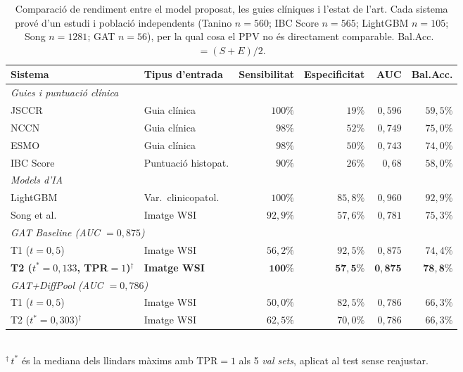 \documentclass[10pt,a4paper,twocolumn,twoside]{article}
\begin{document}
\begin{table}[h]
\centering
\caption{Comparació de rendiment entre el model proposat, les guies clíniques i l'estat de l'art.
Cada sistema prové d'un estudi i població independents
(Tanino $n\!=\!560$; IBC Score $n\!=\!565$; LightGBM $n\!=\!105$; Song $n\!=\!1281$; GAT $n\!=\!56$),
per la qual cosa el PPV no és directament comparable. Bal.Acc.~$=(S\!+\!E)/2$.}
\label{tab:comparison}
\small
\begin{tabular}{llrrrr}
\toprule
\textbf{Sistema} & \textbf{Tipus d'entrada} & \textbf{Sensibilitat} & \textbf{Especificitat} & \textbf{AUC} & \textbf{Bal.Acc.} \\
\midrule
\multicolumn{6}{l}{\textit{Guies i puntuació clínica}} \\[2pt]
JSCCR \cite{jsccr2019}        & Guia clínica  & $100\%$ & $19\%$  & $0{,}596$ & $59{,}5\%$ \\
NCCN                           & Guia clínica  & $98\%$  & $52\%$  & $0{,}749$ & $75{,}0\%$ \\
ESMO \cite{tanino2024comparative} & Guia clínica  & $98\%$  & $50\%$  & $0{,}743$ & $74{,}0\%$ \\
IBC Score \cite{dawson2024budding} & Puntuació histopat. & $90\%$ & $26\%$ & $0{,}68$ & $58{,}0\%$ \\
\midrule
\multicolumn{6}{l}{\textit{Models d'IA}} \\[2pt]
LightGBM \cite{piao2023ai}                          & Var.\ clinicopatol. & $100\%$  & $85{,}8\%$ & $0{,}960$ & $92{,}9\%$ \\
Song et al.\ \cite{song2024lnm}                     & Imatge WSI & $92{,}9\%$ & $57{,}6\%$ & $0{,}781$ & $75{,}3\%$ \\
\multicolumn{6}{l}{\textit{GAT Baseline (AUC $= 0{,}875$)}} \\[1pt]
\quad T1 ($t\!=\!0{,}5$)                                        & Imatge WSI & $56{,}2\%$ & $92{,}5\%$ & $0{,}875$ & $74{,}4\%$ \\
\textbf{\quad T2 ($t^*\!=\!0{,}133$, TPR$=1$)$^{\dagger}$}     & \textbf{Imatge WSI} & $\mathbf{100\%}$ & $\mathbf{57{,}5\%}$ & $\mathbf{0{,}875}$ & $\mathbf{78{,}8\%}$ \\[2pt]
\multicolumn{6}{l}{\textit{GAT+DiffPool (AUC $= 0{,}786$)}} \\[1pt]
\quad T1 ($t\!=\!0{,}5$)                                        & Imatge WSI & $50{,}0\%$ & $82{,}5\%$ & $0{,}786$ & $66{,}3\%$ \\
\quad T2 ($t^*\!=\!0{,}303$)$^{\dagger}$                       & Imatge WSI & $62{,}5\%$ & $70{,}0\%$ & $0{,}786$ & $66{,}3\%$ \\
\bottomrule
\end{tabular}\\[2pt]
\footnotesize{$^{\dagger}$\,$t^*$ és la mediana dels llindars màxims amb TPR$=1$ als 5 \textit{val sets}, aplicat al test sense reajustar.}
\end{table}
\end{document}

